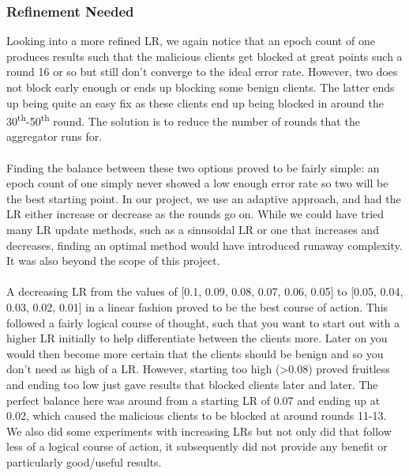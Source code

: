 \subsubsection{Refinement Needed}
Looking into a more refined LR, we again notice that an epoch count of one produces results such that the malicious clients get blocked at great points such a round 16 or so but still don't converge to the ideal error rate.
However, two does not block early enough or ends up blocking some benign clients.
The latter ends up being quite an easy fix as these clients end up being blocked in around the 30\textsuperscript{th}-50\textsuperscript{th} round.
The solution is to reduce the number of rounds that the aggregator runs for.
\\ \\
Finding the balance between these two options proved to be fairly simple: an epoch count of one simply never showed a low enough error rate so two will be the best starting point.
In our project, we use an adaptive approach, and had the LR either increase or decrease as the rounds go on. 
While we could have tried many LR update methods, such as a sinusoidal LR or one that increases and decreases, finding an optimal method would have introduced runaway complexity. It was also beyond the scope of this project.
\\ \\ 
A decreasing LR from the values of [0.1, 0.09, 0.08, 0.07, 0.06, 0.05] to [0.05, 0.04, 0.03, 0.02, 0.01] in a linear fashion proved to be the best course of action.
This followed a fairly logical course of thought, such that you want to start out with a higher LR initially to help differentiate between the clients more.
Later on you would then become more certain that the clients should be benign and so you don't need as high of a LR.
However, starting too high (>0.08) proved fruitless and ending too low just gave results that blocked clients later and later.
The perfect balance here was around from a starting LR of 0.07 and ending up at 0.02, which caused the malicious clients to be blocked at around rounds 11-13.
We also did some experiments with increasing LRs but not only did that follow less of a logical course of action, it subsequently did not provide any benefit or particularly good/useful results.

